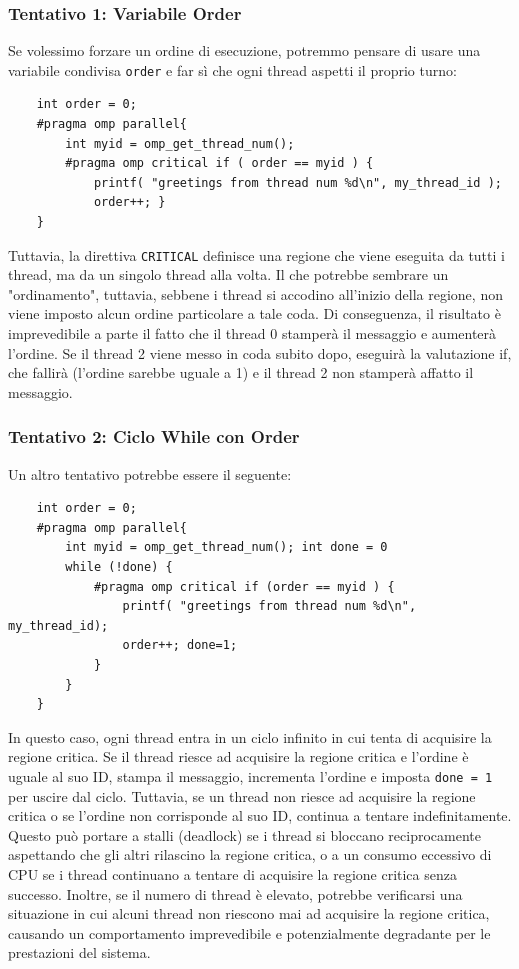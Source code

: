 \subsubsection*{Tentativo 1: Variabile Order}
Se volessimo forzare un ordine di esecuzione, potremmo pensare di usare una variabile condivisa \texttt{order} e far sì che ogni thread aspetti il proprio turno:
\begin{verbatim}
    int order = 0;
    #pragma omp parallel{
        int myid = omp_get_thread_num();
        #pragma omp critical if ( order == myid ) {
            printf( "greetings from thread num %d\n", my_thread_id );
            order++; }
    }
\end{verbatim}
Tuttavia,  la direttiva \texttt{CRITICAL} definisce una regione che viene eseguita da tutti i thread, ma da un singolo thread alla volta. Il che potrebbe sembrare un "ordinamento", tuttavia, sebbene i thread si accodino all'inizio della regione, non viene imposto alcun ordine particolare a tale coda. Di conseguenza, il risultato è imprevedibile a parte il fatto che il thread 0 stamperà il messaggio e aumenterà l'ordine. 
Se il thread 2 viene messo in coda subito dopo, eseguirà la valutazione if, che fallirà (l'ordine sarebbe uguale a 1) e il thread 2 non stamperà affatto il messaggio.
\subsubsection*{Tentativo 2: Ciclo While con Order}
Un altro tentativo potrebbe essere il seguente:
\begin{verbatim}
    int order = 0;
    #pragma omp parallel{
        int myid = omp_get_thread_num(); int done = 0
        while (!done) {
            #pragma omp critical if (order == myid ) {
                printf( "greetings from thread num %d\n", my_thread_id);
                order++; done=1;
            }
        }
    }
\end{verbatim}

In questo caso, ogni thread entra in un ciclo infinito in cui tenta di acquisire la regione critica. Se il thread riesce ad acquisire la regione critica e l'ordine è uguale al suo ID, stampa il messaggio, incrementa l'ordine e imposta \texttt{done = 1} per uscire dal ciclo. 
Tuttavia, se un thread non riesce ad acquisire la regione critica o se l'ordine non corrisponde al suo ID, continua a tentare indefinitamente. 
Questo può portare a stalli (deadlock) se i thread si bloccano reciprocamente aspettando che gli altri rilascino la regione critica, o a un consumo eccessivo di CPU se i thread continuano a tentare di acquisire la regione critica senza successo. 
Inoltre, se il numero di thread è elevato, potrebbe verificarsi una situazione in cui alcuni thread non riescono mai ad acquisire la regione critica, causando un comportamento imprevedibile e potenzialmente degradante per le prestazioni del sistema.

